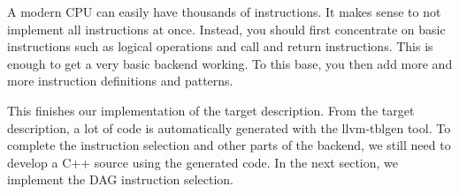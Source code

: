 \begin{tcolorbox}[colback=blue!5!white,colframe=blue!75!black, title=Implement the instructions iteratively]
	
A modern CPU can easily have thousands of instructions. It makes sense to not implement all instructions at once. Instead, you should first concentrate on basic instructions such as logical operations and call and return instructions. This is enough to get a very basic backend working. To this base, you then add more and more instruction definitions and patterns.
\end{tcolorbox}

This finishes our implementation of the target description. From the target description, a lot of code is automatically generated with the llvm-tblgen tool. To complete the instruction selection and other parts of the backend, we still need to develop a C++ source using the generated code. In the next section, we implement the DAG instruction selection.\par





















